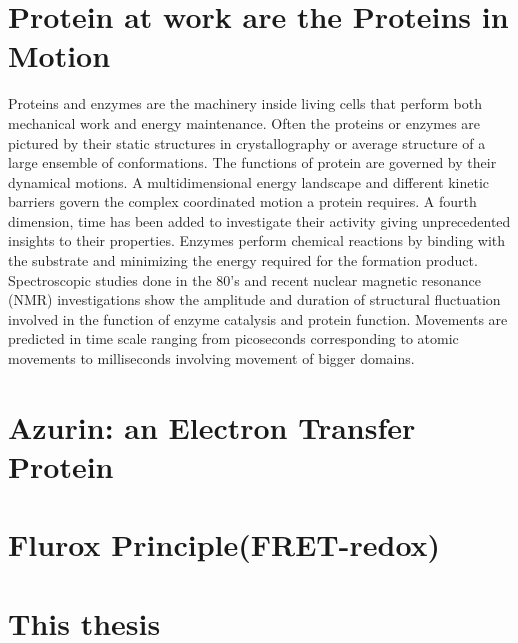 \section{Protein at work are the Proteins in Motion}
Proteins and enzymes are the machinery inside living cells that perform both mechanical work and energy maintenance.
Often the proteins or enzymes are pictured by their static structures in crystallography or average structure of a large ensemble of conformations.
The functions of protein are governed by their dynamical motions.
A multidimensional energy landscape and different kinetic barriers govern the complex coordinated motion a protein requires.
A fourth dimension, time has been added to investigate their activity giving unprecedented insights to their properties.
Enzymes perform chemical reactions by binding with the substrate and minimizing the energy required for the formation product.
Spectroscopic studies done in the 80's and recent nuclear magnetic resonance (NMR) investigations show the amplitude and duration of structural fluctuation involved in the function of enzyme catalysis and protein function.
Movements are predicted in time scale ranging from picoseconds corresponding to atomic movements to milliseconds involving movement of bigger domains.\cite{henzler-wildman2007dynamic,frauenfelder1991the}


\section{Azurin: an Electron Transfer Protein}
\section{Flurox Principle(FRET-redox)}
%
\section{This thesis}